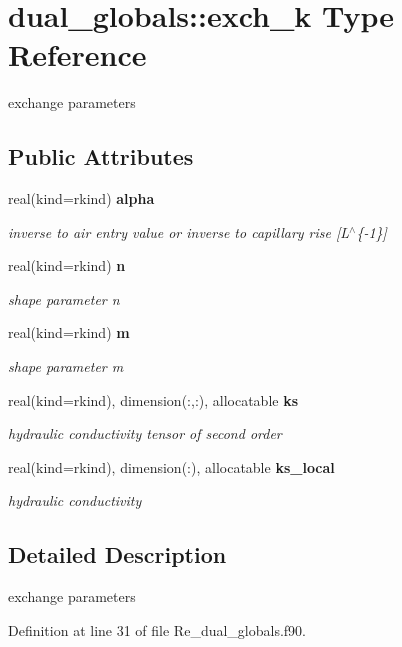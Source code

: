 \section{dual\+\_\+globals\+:\+:exch\+\_\+k Type Reference}
\label{structdual__globals_1_1exch__k}


exchange parameters  


\subsection*{Public Attributes}
\begin{DoxyCompactItemize}
\item 
real(kind=rkind) {\bf alpha}
\begin{DoxyCompactList}\small\item\em inverse to air entry value or inverse to capillary rise [L$^\wedge$\{-\/1\}] \end{DoxyCompactList}\item 
real(kind=rkind) {\bf n}
\begin{DoxyCompactList}\small\item\em shape parameter n \end{DoxyCompactList}\item 
real(kind=rkind) {\bf m}
\begin{DoxyCompactList}\small\item\em shape parameter m \end{DoxyCompactList}\item 
real(kind=rkind), dimension(\+:,\+:), allocatable {\bf ks}
\begin{DoxyCompactList}\small\item\em hydraulic conductivity tensor of second order \end{DoxyCompactList}\item 
real(kind=rkind), dimension(\+:), allocatable {\bf ks\+\_\+local}
\begin{DoxyCompactList}\small\item\em hydraulic conductivity \end{DoxyCompactList}\end{DoxyCompactItemize}


\subsection{Detailed Description}
exchange parameters 

Definition at line 31 of file Re\+\_\+dual\+\_\+globals.\+f90.



